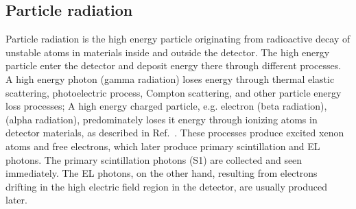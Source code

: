 \subsection{Particle radiation}
\label{sec:events particle}
Particle radiation is the high energy particle originating from radioactive decay of unstable atoms in materials inside and outside the detector. The high energy particle enter the detector and deposit energy there through different processes. A high energy photon (gamma radiation) loses energy through thermal elastic scattering, photoelectric process, Compton scattering, and other particle energy loss processes; A high energy charged particle, e.g. electron (beta radiation),  (alpha radiation), predominately loses it energy through ionizing atoms in detector materials, as described in Ref.~\cite{Blum2008}.  These processes produce excited xenon atoms and free electrons, which later produce primary scintillation and EL photons. The primary scintillation photons (S1) are collected and seen immediately. The EL photons, on the other hand, resulting from electrons drifting in the high electric field region in the detector, are usually produced later. 

